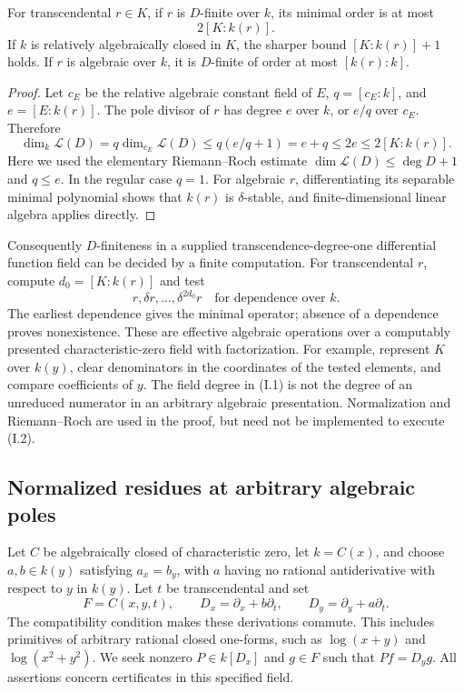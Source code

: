 \begin{corollary}
\label{int:bound}
For transcendental $r\in K$, if $r$ is $D$-finite over $k$, its minimal
order is at most
\[
                    2[K:k(r)].                         \tag{I.1}
\]
If $k$ is relatively algebraically closed in $K$, the sharper bound
$[K:k(r)]+1$ holds.  If $r$ is algebraic over $k$, it is $D$-finite of
order at most $[k(r):k]$.
\end{corollary}
\begin{proof}
Let $c_E$ be the relative algebraic constant field of $E$,
$q=[c_E:k]$, and $e=[E:k(r)]$.  The pole divisor of $r$ has degree
$e$ over $k$, or $e/q$ over $c_E$.  Therefore
\[
 \dim_k\mathcal L(D)
 =q\dim_{c_E}\mathcal L(D)
 \leq q(e/q+1)=e+q\leq2e\leq2[K:k(r)].
\]
Here we used the elementary Riemann--Roch estimate
$\dim\mathcal L(D)\leq\deg D+1$ and $q\leq e$.
In the regular case $q=1$.  For algebraic $r$, differentiating its
separable minimal polynomial shows that $k(r)$ is $\delta$-stable, and
finite-dimensional linear algebra applies directly.
\end{proof}

Consequently $D$-finiteness in a supplied transcendence-degree-one
differential function field can be decided by a finite computation.
For transcendental $r$, compute $d_0=[K:k(r)]$ and test
\[
                  r,\delta r,\ldots,\delta^{2d_0}r
                  \quad\text{for dependence over }k.       \tag{I.2}
\]
The earliest dependence gives the minimal operator; absence of a
dependence proves nonexistence.  These are effective algebraic operations
over a computably presented characteristic-zero field with factorization.
For example, represent $K$ over $k(y)$, clear denominators in the
coordinates of the tested elements, and compare coefficients of $y$.
The field degree in (I.1) is not the degree of an unreduced numerator in
an arbitrary algebraic presentation.  Normalization and Riemann--Roch
are used in the proof, but need not be implemented to execute (I.2).

\subsection{Normalized residues at arbitrary algebraic poles}

Let $C$ be algebraically closed of characteristic zero, let $k=C(x)$,
and choose $a,b\in k(y)$ satisfying $a_x=b_y$, with $a$ having no
rational antiderivative with respect to $y$ in $k(y)$.
Let $t$ be transcendental and set
\[
 F=C(x,y,t),\qquad D_x=\partial_x+b\partial_t,\qquad
 D_y=\partial_y+a\partial_t.                            \tag{I.3}
\]
The compatibility condition makes these derivations commute.  This
includes primitives of arbitrary rational closed one-forms, such as
$\log(x+y)$ and $\log(x^2+y^2)$.
We seek nonzero $P\in k[D_x]$ and $g\in F$ such that $Pf=D_yg$.
All assertions concern certificates in this specified field.

